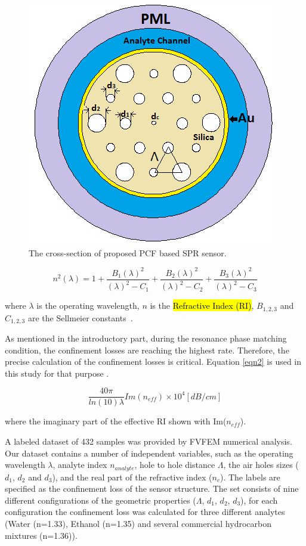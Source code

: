 \documentclass[journal]{IEEEtran}
\begin{document}
\begin{figure}[]
	\centering
	\includegraphics[width=.7\linewidth]{figures/Figx}
	\caption{The cross-section of proposed  PCF based SPR sensor.}
	\label{Figx}
\end{figure}




\begin{equation}
n^2(\lambda)=1+\frac{ B_1 (\lambda)^2} {(\lambda)^2-C_1} + \frac{ B_2 (\lambda)^2} {(\lambda)^2-C_2} + \frac{ B_3 (\lambda)^2} {(\lambda)^2-C_3}
\label{eqn1}
\end{equation}

where $\lambda$ is the operating wavelength, $n$ is the \hl{Refractive Index (RI)}, $B_{1,2,3}$ and  $C_{1,2,3}$ are the  Sellmeier constants~\cite{bjarklev2003PCF}.

As mentioned in the introductory part, during the resonance phase matching condition, the confinement losses are reaching the highest rate. Therefore, the precise calculation of the confinement losses is critical. Equation \ref{eqn2} is used in this study for that purpose \cite{yasli2019effect}.



\begin{equation}
\frac{40\pi}{ln(10) \lambda} Im(n_{eff}) \times 10^{4} [dB/cm]
\label{eqn2}
\end{equation}

where the imaginary part of the effective RI shown with Im($n_{eff}$).

A labeled dataset of 432 samples was provided by FVFEM numerical analysis. Our dataset contains a number of independent variables, such as the operating wavelength  $\lambda$, analyte index $n_{analyte}$, hole to hole distance $\Lambda$, the air holes sizes ($d_1$, $d_2$ and $d_3$), and the real part of the refractive index ($n_c$). The labels are specified as the confinement loss of the sensor structure. The set consists of nine different configurations of the geometric properties ($\Lambda$, $d_1$, $d_2$, $d_3$), for each configuration the confinement loss was calculated for three different analytes (Water (n=1.33), Ethanol (n=1.35) and several commercial hydrocarbon mixtures (n=1.36)).
\end{document}
